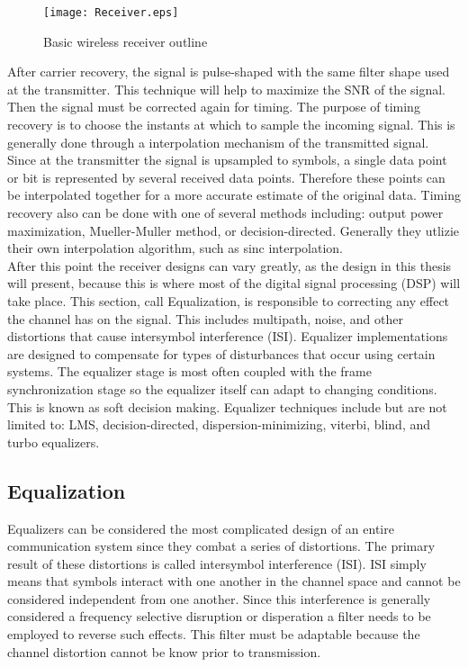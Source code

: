 \begin{figure}[!ht]\label{Receiver_Blocks}
\centering
\texttt{[image: Receiver.eps]}
\caption{Basic wireless receiver outline}
\end{figure}

After carrier recovery, the signal is pulse-shaped with the same filter shape used at the transmitter.  This technique will help to maximize the SNR of the signal.  Then the signal must be corrected again for timing.  The purpose of timing recovery is to choose the instants at which to sample the incoming signal.  This is generally done through a interpolation mechanism of the transmitted signal.  Since at the transmitter the signal is upsampled to symbols, a single data point or bit is represented by several received data points.  Therefore these points can be interpolated together for a more accurate estimate of the original data.  Timing recovery also can be done with one of several methods including: output power maximization, Mueller-Muller method, or decision-directed.  Generally they utlizie their own interpolation algorithm, such as sinc interpolation.\\

After this point the receiver designs can vary greatly, as the design in this thesis will present, because this is where most of the digital signal processing (DSP) will take place.  This section, call Equalization, is responsible to correcting any effect the channel has on the signal. This includes multipath, noise, 	and other distortions that cause intersymbol interference (ISI).  Equalizer implementations are designed to compensate for types of disturbances that occur using certain systems.  The equalizer stage is most often coupled with the frame synchronization stage so the equalizer itself can adapt to changing conditions.  This is known as soft decision making.  Equalizer techniques include but are not limited to: LMS, decision-directed, dispersion-minimizing, viterbi, blind, and turbo equalizers.\\  

\subsection{Equalization}

Equalizers can be considered the most complicated design of an entire communication system since they combat a series of distortions.  The primary result of these distortions is called intersymbol interference (ISI).  ISI simply means that symbols interact with one another in the channel space and cannot be considered independent from one another.  Since this interference is generally considered a frequency selective disruption or disperation a filter needs to be employed to reverse such effects.  This filter must be adaptable because the channel distortion cannot be know prior to transmission.\\  

